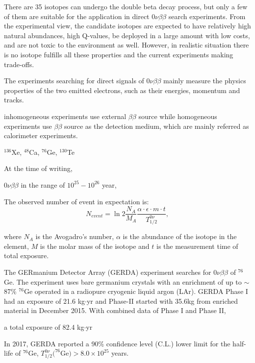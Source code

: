 There are 35 isotopes can undergo the double beta decay process, but only a few of them are suitable for the application in direct $0\nu\beta\beta$ search experiments\cite{giunti2007fundamentals}. From the experimental view, the candidate isotopes are expected to have relatively high natural abundances, high Q-values, be deployed in a large amount with low costs, and are not toxic to the environment as well. However, in realistic situation there is no isotope fulfills all these properties and the current experiments making trade-offs\cite{dolinski2019neutrinoless}.

The experiments searching for direct signals of $0\nu\beta\beta$ mainly measure the physics properties of the two emitted electrons, such as their energies, momentum and tracks. 

inhomogeneous experiments use external $\beta\beta$ source
while homogeneous experiments use $\beta\beta$ source as the detection medium, which are mainly referred as calorimeter experiments\cite{cremonesi2014challenges,shimizu2019double}.


$^{136}$Xe, $^{48}$Ca, $^{76}$Ge, $^{130}$Te

At the time of writing, 

$0\nu\beta\beta$ in the range of $10^{25}-10^{26}$ year,



The observed number of event in expectation is: 
\[
N_{event} = \ln 2 \frac{N_A}{M_A}\frac{\alpha\cdot\epsilon\cdot m\cdot t}{T^{0\nu}_{1/2}},
\]

where $N_A$ is the Avogadro's number, $\alpha$ is the abundance of the isotope in the element, 
$M$ is the molar mass of the isotope
and $t$ is the measurement time of total exposure.



The GERmanium Detector Array (GERDA) experiment searches for $0\nu\beta\beta$ of $^{76}$Ge. The experiment uses bare germanium crystals with an enrichment of up to $\sim$87\% $^{76}$Ge operated in a radiopure cryogenic liquid argon (LAr)\cite{agostini2016search}. GERDA Phase I had an exposure of 21.6 kg$\cdot$yr and Phase-II started with 35.6kg from enriched material in December 2015. With combined data of Phase I and Phase II, 

a total exposure of 82.4 kg$\cdot$yr 

In 2017, GERDA reported a 90\% confidence level (C.L.) lower limit for the half-life of $^{76}$Ge, $T^{0\nu}_{1/2}(^{76}$Ge$)>8.0\times 10^{25}$ years.

